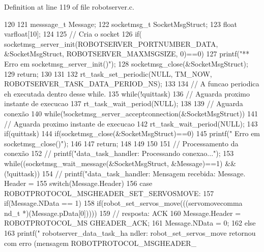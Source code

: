 Definition at line 119 of file robotserver.c.


\begin{DoxyCode}
120 {
121         messsage_t Message;
122         socketmsg_t SocketMsgStruct;
123         float varfloat[10];
124 
125         // Cria o socket
126         if( socketmsg_server_init(ROBOTSERVER_PORTNUMBER_DATA, &SocketMsgStruct, 
      ROBOTSERVER_MAXMSGSIZE, 0)==0){
127                 printf("\n*** Erro em socketmsg_server_init()");
128                 socketmsg_close(&SocketMsgStruct);
129                 return;
130         }
131 
132         rt_task_set_periodic(NULL, TM_NOW, ROBOTSERVER_TASK_DATA_PERIOD_NS);
133 
134         // A funcao periodica eh executada dentro desse while. 
135         while(!quittask) {
136                 // Aguarda proximo instante de execucao
137                 rt_task_wait_period(NULL);
138 
139                 // Aguarda conexão
140                 while(!socketmsg_server_acceptconnection(&SocketMsgStruct)) {
141                         // Aguarda proximo instante de execucao
142                         rt_task_wait_period(NULL);
143                         if(quittask){
144                                 if(socketmsg_close(&SocketMsgStruct)==0){
145                                         printf(" Erro em socketmsg_close()"); 
146                                 }
147                                 return;
148                         }
149                 }
150                 
151                 // Processamento da conexão
152 //              printf("\n data_task_handler: Processando conexao...");
153                 while((socketmsg_wait_message(&SocketMsgStruct, &Message)==1) && 
      (!quittask)) {
154 //                      printf("\n data_task_handler: Mensagem recebida: Message.
      Header = %
155                         switch(Message.Header){
156                         case ROBOTPROTOCOL_MSGHEADER_SET_SERVOSMOVE:
157                                 if(Message.NData == 1){
158                                         if(robot_set_servos_move(((servomovecomma
      nd_t *)(Message.pData[0])))){
159                                                 // resposta: ACK
160                                                 Message.Header = ROBOTPROTOCOL_MS
      GHEADER_ACK;
161                                                 Message.NData = 0;
162                                         } else{
163                                                 printf(" robotserver_data_task_ha
      ndler: robot_set_servos_move retornou com erro (mensagem ROBOTPROTOCOL_MSGHEADER_
}}}}}}
\end{DoxyCode}
